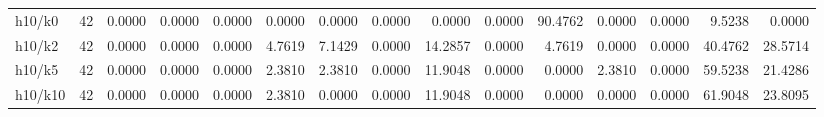 \begin{tabular}{lrrrrrrrrrrrrrr}
h10/k0 & 42 & 0.0000 & 0.0000 & 0.0000 & 0.0000 & 0.0000 & 0.0000 & 0.0000 & 0.0000 & 90.4762 & 0.0000 & 0.0000 & 9.5238 & 0.0000 \\
h10/k2 & 42 & 0.0000 & 0.0000 & 0.0000 & 4.7619 & 7.1429 & 0.0000 & 14.2857 & 0.0000 & 4.7619 & 0.0000 & 0.0000 & 40.4762 & 28.5714 \\
h10/k5 & 42 & 0.0000 & 0.0000 & 0.0000 & 2.3810 & 2.3810 & 0.0000 & 11.9048 & 0.0000 & 0.0000 & 2.3810 & 0.0000 & 59.5238 & 21.4286 \\
h10/k10 & 42 & 0.0000 & 0.0000 & 0.0000 & 2.3810 & 0.0000 & 0.0000 & 11.9048 & 0.0000 & 0.0000 & 0.0000 & 0.0000 & 61.9048 & 23.8095 \\
\bottomrule
\end{tabular}
